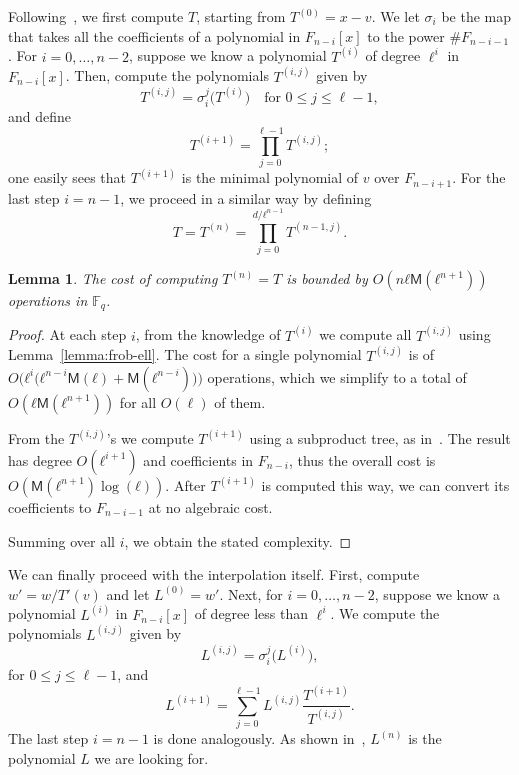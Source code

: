 \documentclass{lms}
\newtheorem{lem}[thm]{Lemma}
\def\cout#1{\mathsf{#1}}
\newcommand{\F}{\mathbb{F}}
\newcommand{\MM}{\cout{M}}
\begin{document}
Following~\cite{df10}, we first compute $T$, starting from
$T^{(0)}=x-v$.  We let $\sigma_i$ be the map that takes all the
coefficients of a polynomial in $F_{n-i}[x]$ to the power
$\#F_{n-i-1}$. For $i=0,\dots,n-2$, suppose we know a polynomial
$T^{(i)}$ of degree $\ell^i$ in $F_{n-i}[x]$. Then, compute the
polynomials $T^{(i,j)}$ given by
\begin{equation*}
  T^{(i,j)}= \sigma_i^j\bigl (T^{(i)} \bigr)
  \quad\text{for $0 \le j \le \ell-1$},
\end{equation*}
and define
$$T^{(i+1)}=\prod_{j=0}^{\ell-1} T^{(i,j)};$$ one easily sees that
$T^{(i+1)}$ is the minimal polynomial of $v$ over $F_{n-i+1}$. For the
last step $i=n-1$, we proceed in a similar way by defining
\begin{equation*}
  T = T^{(n)}=\prod_{j=0}^{d/ℓ^{n-1}} T^{(n-1,j)}.
\end{equation*}

\begin{lem}\label{lemma:interpolation:minpoly}
  The cost of computing $T^{(n)}=T$ is bounded by $O(nℓ\MM(ℓ^{n+1}))$
  operations in $\F_q$.
\end{lem}

\begin{proof}
  At each step $i$, from the knowledge of $T^{(i)}$ we compute all
  $T^{(i,j)}$ using Lemma~\ref{lemma:frob-ell}. The cost for a single
  polynomial $T^{(i,j)}$ is of
  $O\bigl(ℓ^i\bigl(ℓ^{n-i}\MM(ℓ)+\MM(ℓ^{n-i})\bigr)\bigr)$ operations,
  which we simplify to a total of $O(ℓ\MM(ℓ^{n+1}))$ for all $O(\ell)$
  of them.

  From the $T^{(i,j)}$'s we compute $T^{(i+1)}$ using a subproduct
  tree, as in~\cite[Lemma~10.4]{vzGG}. The result has degree
  $O(ℓ^{i+1})$ and coefficients in $F_{n-i}$, thus the overall cost is
  $O(\MM(ℓ^{n+1})\log(ℓ))$. After $T^{(i+1)}$ is computed this way, we
  can convert its coefficients to $F_{n-i-1}$ at no algebraic cost.

  Summing over all $i$, we obtain the stated complexity.
\end{proof}

We can finally proceed with the interpolation itself. First, compute
$w' = w/T'(v)$ and let $L^{(0)}=w'$.  Next, for $i=0,\dots,n-2$,
suppose we know a polynomial $L^{(i)}$ in $F_{n-i}[x]$ of degree less
than $\ell^i$. We compute the polynomials $L^{(i,j)}$ given by
$$L^{(i,j)}= \sigma_i^j\bigl(L^{(i)}\bigr),$$
for $0 \le j \le \ell-1$, and
$$L^{(i+1)} = \sum_{j=0}^{\ell-1} L^{(i,j)}\frac{T^{(i+1)}}{T^{(i,j)}}.$$ The last step $i=n-1$
is done analogously.  As shown in~\cite{df10}, $L^{(n)}$ is the
polynomial $L$ we are looking for.
\end{document}
